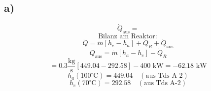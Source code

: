 

\subsection*{a)}
\[
\dot{Q}_{\text{aus}} = 
\]
\[
\text{Bilanz am Reaktor}:
\]
\[
\dot{Q} = \dot{m} \left[ h_e - h_a \right] + \dot{Q}_R + \dot{Q}_{\text{aus}}
\]
\[
\dot{Q}_{\text{aus}} = \dot{m} \left[ h_a - h_e \right] - \dot{Q}_R
\]
\[
= 0.3 \frac{\text{kg}}{\text{s}} \left[ 449.04 - 292.58 \right] - 400 \text{ kW} = -62.18 \text{ kW}
\]
\[
h_a (100^\circ \text{C}) = 449.04 \quad (\text{aus Tds A-2})
\]
\[
h_e (70^\circ \text{C}) = 292.58 \quad (\text{aus Tds A-2})
\]